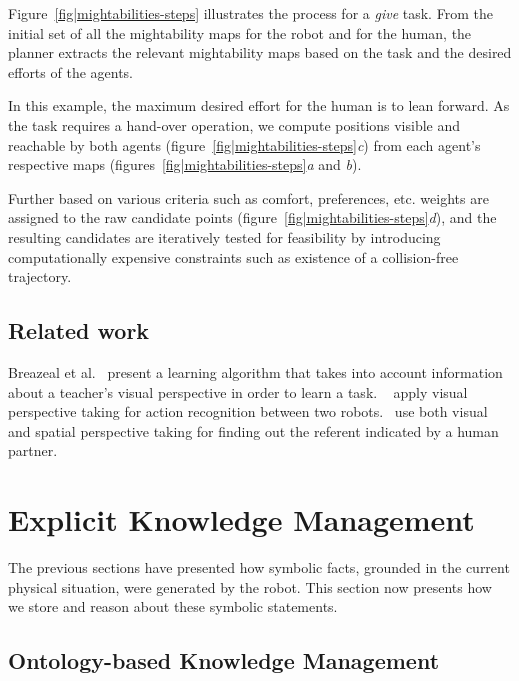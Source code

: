 \documentclass{svmult}
\begin{document}
Figure~\ref{fig|mightabilities-steps} illustrates the process for a \emph{give}
task. From the initial set of all the mightability maps for the robot and for
the human, the planner extracts the relevant mightability maps based on the
task and the desired efforts of the agents.

In this example, the maximum desired effort for the human is to lean forward.
As the task requires a hand-over operation, we compute positions visible and
reachable by both agents (figure~\ref{fig|mightabilities-steps}{\it c}) from
each agent's respective maps (figures~\ref{fig|mightabilities-steps}{\it a} and
{\it b}).

Further based on various criteria such as comfort, preferences, etc. weights
are assigned to the raw candidate points
(figure~\ref{fig|mightabilities-steps}{\it d}), and the resulting candidates are
iteratively tested for feasibility by introducing computationally expensive
constraints such as existence of a collision-free trajectory.

\subsection{Related work}

Breazeal et al.~\cite{breazeal2006} present a learning algorithm that takes
into account information about a teacher's visual perspective in order to learn
a task.  ~\cite{Johnson2005} apply visual perspective taking for action
recognition between two robots.~\cite{Trafton2005} use both visual and spatial
perspective taking for finding out the referent indicated by a human partner.


\section{Explicit Knowledge Management}
\label{cognitivekernel}

The previous sections have presented how symbolic facts, grounded in the
current physical situation, were generated by the robot. This section now
presents how we store and reason about these symbolic statements.

\subsection{Ontology-based Knowledge Management}
\end{document}
